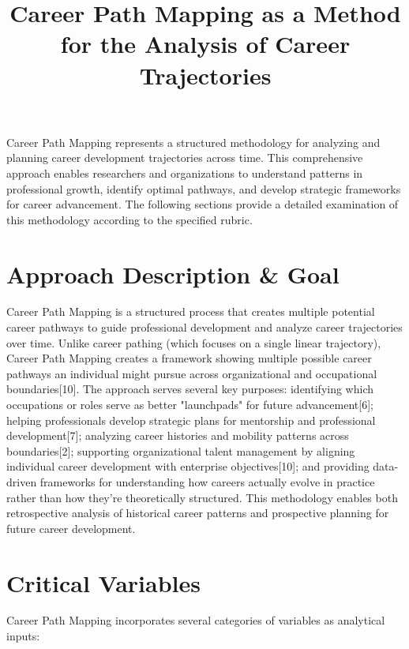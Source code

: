 \documentclass{article}
\title{Career Path Mapping as a Method for the Analysis of Career Trajectories}
\author{}
\date{}
\begin{document}
\maketitle

Career Path Mapping represents a structured methodology for analyzing and planning career development trajectories across time. This comprehensive approach enables researchers and organizations to understand patterns in professional growth, identify optimal pathways, and develop strategic frameworks for career advancement. The following sections provide a detailed examination of this methodology according to the specified rubric.


\section{Approach Description \& Goal}

Career Path Mapping is a structured process that creates multiple potential career pathways to guide professional development and analyze career trajectories over time. Unlike career pathing (which focuses on a single linear trajectory), Career Path Mapping creates a framework showing multiple possible career pathways an individual might pursue across organizational and occupational boundaries[10]. The approach serves several key purposes: identifying which occupations or roles serve as better "launchpads" for future advancement[6]; helping professionals develop strategic plans for mentorship and professional development[7]; analyzing career histories and mobility patterns across boundaries[2]; supporting organizational talent management by aligning individual career development with enterprise objectives[10]; and providing data-driven frameworks for understanding how careers actually evolve in practice rather than how they're theoretically structured. This methodology enables both retrospective analysis of historical career patterns and prospective planning for future career development.

\section{Critical Variables}

Career Path Mapping incorporates several categories of variables as analytical inputs:
\end{document}
